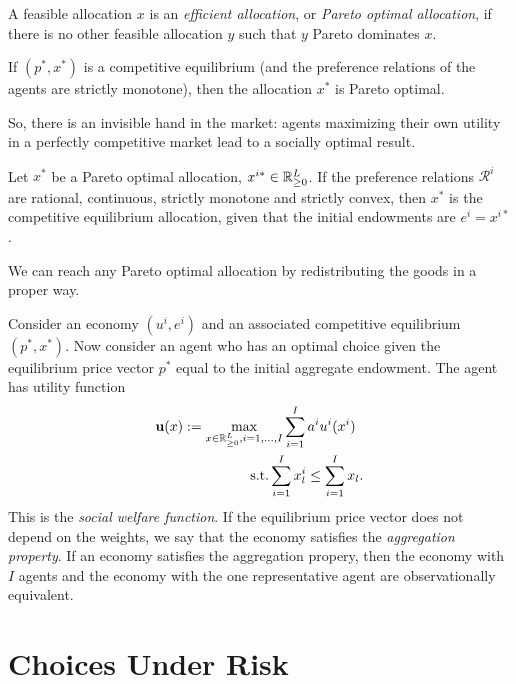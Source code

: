 \documentclass[twoside]{article}
\begin{document}
A feasible allocation $x$ is an \textit{efficient allocation}, or \textit{Pareto optimal allocation}, if there is no other feasible allocation $y$ such that $y$ Pareto dominates $x$.

\begin{theorem}
    If $(p^*, x^*)$ is a competitive equilibrium (and the preference relations of the agents are strictly monotone), then the allocation $x^*$ is Pareto optimal.
    \begin{explanation}
        So, there is an invisible hand in the market: agents maximizing their own utility in a perfectly competitive market lead to a socially optimal result.
    \end{explanation}
\end{theorem}

\begin{theorem}
    Let $x^*$ be a Pareto optimal allocation, $x^{i*} \in \mathbb{R}_{\geq0}^L$. If the preference relations $\mathcal{R}^i$ are rational, continuous, strictly monotone and strictly convex, then $x^*$ is the competitive equilibrium allocation, given that the initial endowments are $e^i = x^{i*}$.
    \begin{explanation}
        We can reach any Pareto optimal allocation by redistributing the goods in a proper way.
    \end{explanation}
\end{theorem}

Consider an economy $(u^i, e^i)$ and an associated competitive equilibrium $(p^*, x^*)$. Now consider an agent who has an optimal choice given the equilibrium price vector $p^*$ equal to the initial aggregate endowment. The agent has utility function
\begin{align*}
    \textbf{u}(x) := \max_{x \in \mathbb{R}_{\geq0}^L, i=1, \dots, I} \sum^I_{i=1}a^i u^i(x^i) \;\; \\ \text{s.t.} \sum^I_{i=1}x^i_l \leq \sum^I_{i=1}x_l.
\end{align*}
This is the \textit{social welfare function}. If the equilibrium price vector does not depend on the weights, we say that the economy satisfies the \textit{aggregation property}. If an economy satisfies the aggregation propery, then the economy with $I$ agents and the economy with the one representative agent are observationally equivalent.

\section{Choices Under Risk}
\end{document}
